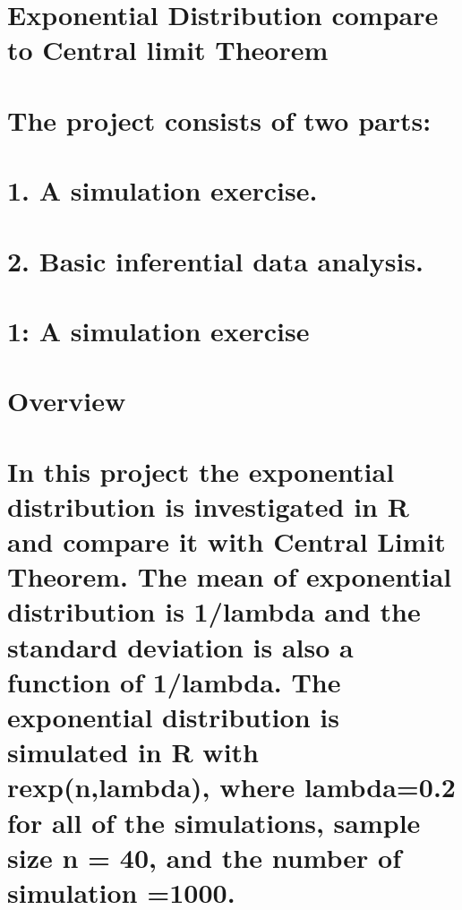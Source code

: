 \documentclass[
]{article}
\author{}
\date{\vspace{-2.5em}}
\begin{document}
\hypertarget{exponential-distribution-compare-to-central-limit-theorem}{%
\section{Exponential Distribution compare to Central limit
Theorem}\label{exponential-distribution-compare-to-central-limit-theorem}}

\hypertarget{the-project-consists-of-two-parts}{%
\section{The project consists of two
parts:}\label{the-project-consists-of-two-parts}}

\hypertarget{a-simulation-exercise.}{%
\section{1. A simulation exercise.}\label{a-simulation-exercise.}}

\hypertarget{basic-inferential-data-analysis.}{%
\section{2. Basic inferential data
analysis.}\label{basic-inferential-data-analysis.}}

\hypertarget{a-simulation-exercise}{%
\section{1: A simulation exercise}\label{a-simulation-exercise}}

\hypertarget{overview}{%
\section{Overview}\label{overview}}

\hypertarget{in-this-project-the-exponential-distribution-is-investigated-in-r-and-compare-it-with-central-limit-theorem.-the-mean-of-exponential-distribution-is-1lambda-and-the-standard-deviation-is-also-a-function-of-1lambda.-the-exponential-distribution-is-simulated-in-r-with-rexpnlambda-where-lambda0.2-for-all-of-the-simulations-sample-size-n-40-and-the-number-of-simulation-1000.}{%
\section{In this project the exponential distribution is investigated in
R and compare it with Central Limit Theorem. The mean of exponential
distribution is 1/lambda and the standard deviation is also a function
of 1/lambda. The exponential distribution is simulated in R with
rexp(n,lambda), where lambda=0.2 for all of the simulations, sample size
n = 40, and the number of simulation
=1000.}\label{in-this-project-the-exponential-distribution-is-investigated-in-r-and-compare-it-with-central-limit-theorem.-the-mean-of-exponential-distribution-is-1lambda-and-the-standard-deviation-is-also-a-function-of-1lambda.-the-exponential-distribution-is-simulated-in-r-with-rexpnlambda-where-lambda0.2-for-all-of-the-simulations-sample-size-n-40-and-the-number-of-simulation-1000.}}
\end{document}
